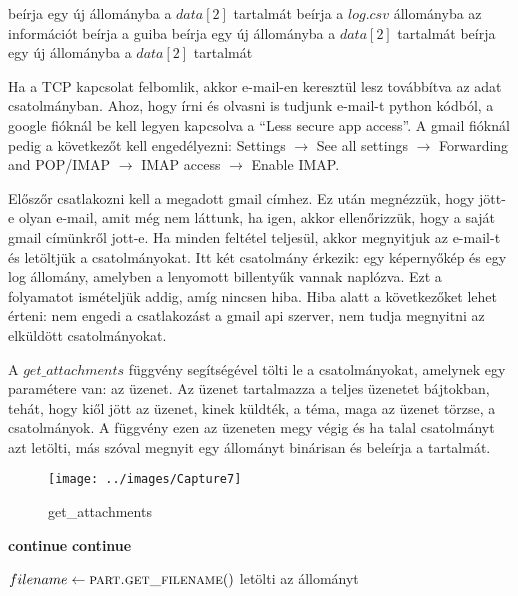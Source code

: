 \documentclass[a4paper, 11pt]{article}
\begin{document}
\begin{algorithmic}[H]
		\State beírja egy új állományba a $data[2]$ tartalmát
	\EndIf
{}
	\State beírja a $log.csv$ állományba az információt
		\State beírja a guiba
	\EndIf
{}
		\State beírja egy új állományba a $data[2]$ tartalmát
	\EndIf
{}
		\State beírja egy új állományba a $data[2]$ tartalmát
	\EndIf
\EndIf
\end{algorithmic}

Ha a TCP kapcsolat felbomlik, akkor e-mail-en keresztül lesz továbbítva az adat csatolmányban. Ahoz, hogy írni és olvasni is tudjunk e-mail-t python kódból, a google fióknál be kell legyen kapcsolva a ``Less secure app access''. A gmail fióknál pedig a következőt kell engedélyezni: Settings $\rightarrow$ See all settings $\rightarrow$ Forwarding and POP/IMAP $\rightarrow$ IMAP access $\rightarrow$ Enable IMAP.

Előszőr csatlakozni kell a megadott gmail címhez. Ez után megnézzük, hogy jött-e olyan e-mail, amit még nem láttunk, ha igen, akkor ellenőrizzük, hogy a saját gmail címünkről jott-e. Ha minden feltétel teljesül, akkor megnyitjuk az e-mail-t és letöltjük a csatolmányokat. Itt két csatolmány érkezik: egy képernyőkép és egy log állomány, amelyben a lenyomott billentyűk vannak naplózva. Ezt a folyamatot ismételjük addig, amíg nincsen hiba. Hiba alatt a következőket lehet érteni: nem engedi a csatlakozást a gmail api szerver, nem tudja megnyitni az elküldött csatolmányokat.

A $get\_attachments$ függvény segítségével tölti le a csatolmányokat, amelynek egy paramétere van: az üzenet. Az üzenet tartalmazza a teljes üzenetet bájtokban, tehát, hogy kiől jött az üzenet, kinek küldték, a téma, maga az üzenet törzse, a csatolmányok. A függvény ezen az üzeneten megy végig és ha talal csatolmányt azt letölti, más szóval megnyit egy állományt binárisan és beleírja a tartalmát.
\begin{figure}[H]
\centering
\texttt{[image: ../images/Capture7]}
\caption{get\_attachments}
\label{fig:getatt}
\end{figure}

\begin{algorithmic}[H]
			\State \textbf{continue}
		\EndIf
			\State \textbf{continue}
		\EndIf
		
		\State $filename \gets \Call{part.get\_filename}{$$}$
			\State letölti az állományt
		\EndIf
	\EndFor
\EndFunction
\end{algorithmic}
\end{document}
